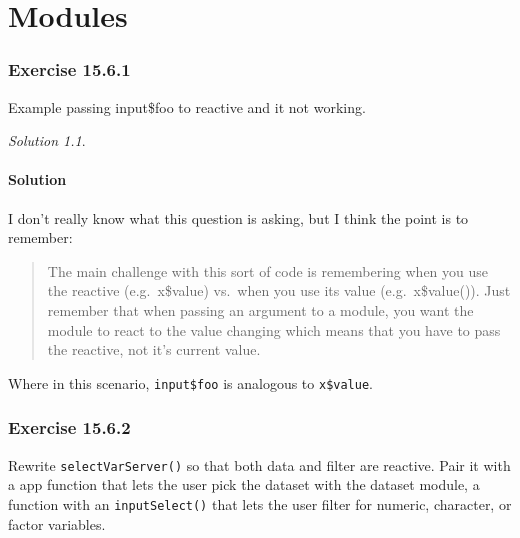 \documentclass[
]{book}
\theoremstyle{definition}
\theoremstyle{definition}
\theoremstyle{definition}
\theoremstyle{definition}
\theoremstyle{remark}
\newtheorem*{solution}{Solution}
\begin{document}
\hypertarget{modules}{%
\chapter{Modules}\label{modules}}

\hypertarget{exercise-15.6.1}{%
\subsection*{Exercise 15.6.1}\label{exercise-15.6.1}}

Example passing input\$foo to reactive and it not working.

\begin{solution}
\leavevmode

\hypertarget{solution-46}{%
\subsubsection*{Solution}\label{solution-46}}

I don't really know what this question is asking, but I think the point is to remember:

\begin{quote}
The main challenge with this sort of code is remembering when you use the reactive (e.g.~x\$value) vs.~when you use its value (e.g.~x\$value()). Just remember that when passing an argument to a module, you want the module to react to the value changing which means that you have to pass the reactive, not it's current value.
\end{quote}

Where in this scenario, \texttt{input\$foo} is analogous to \texttt{x\$value}.

\end{solution}

\hypertarget{exercise-15.6.2}{%
\subsection*{Exercise 15.6.2}\label{exercise-15.6.2}}

Rewrite \texttt{selectVarServer()} so that both data and filter are reactive. Pair it with a app function that lets the user pick the dataset with the dataset module, a function with an \texttt{inputSelect()} that lets the user filter for numeric, character, or factor variables.
\end{document}
